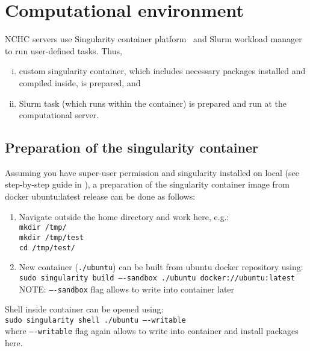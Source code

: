 \cleardoublepage
\section{Computational environment}
\label{sec:env}

NCHC servers use Singularity container platform~\cite{singularity} and Slurm workload manager~\cite{slurm} to run user-defined tasks. Thus,  
\begin{enumerate}[(i)]
    \item custom singularity container, which includes necessary packages installed and compiled inside, is prepared, and
    \item Slurm task (which runs within the container) is prepared and run at the computational server.
\end{enumerate}

\subsection{Preparation of the singularity container}
\label{subsec:prepCont}

Assuming you have super-user permission and singularity installed on local (see step-by-step guide in \cite{singularityInstall}), a preparation of the singularity container image from docker ubuntu:latest release can be done as follows: 
\begin{enumerate}
    \item Navigate outside the home directory and work here, e.g.: \\[0.2cm] 
    \texttt{mkdir /tmp/} \\[0.2cm] 
    \texttt{mkdir /tmp/test} \\[0.2cm] 
    \texttt{cd /tmp/test/} 
    \item New container (\texttt{./ubuntu}) can be built from ubuntu docker repository using:\\[0.2cm] 
    \texttt{sudo singularity build ----sandbox ./ubuntu docker://ubuntu:latest}\\[0.2cm] 
    {NOTE:} \texttt{----sandbox} flag allows to write into container later
\end{enumerate}

Shell inside container can be opened using: \\[0.2cm]
\indent\quad\quad\texttt{sudo singularity shell ./ubuntu ----writable} \\[0.2cm]
where \texttt{----writable} flag again allows to write into container and install packages here.

